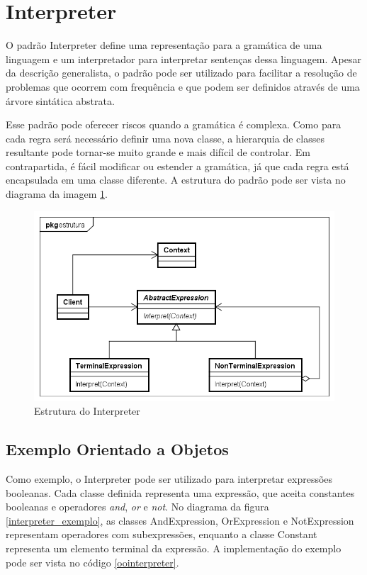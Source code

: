 \section{Interpreter}

O padrão Interpreter define uma representação para 
a gramática de uma linguagem e um interpretador para 
interpretar sentenças dessa linguagem. Apesar da 
descrição generalista, o padrão 
pode ser utilizado para facilitar a resolução de 
problemas que ocorrem com frequência e que podem 
ser definidos através de uma árvore sintática 
abstrata.\cite{gamma:1995}

Esse padrão pode oferecer riscos quando a gramática 
é complexa. Como para cada regra será necessário 
definir uma nova classe, a hierarquia de classes 
resultante pode tornar-se muito grande e mais 
difícil de controlar. Em contrapartida, é 
fácil modificar ou estender a gramática, já 
que cada regra está encapsulada em uma classe 
diferente. A estrutura do padrão pode ser vista 
no diagrama da imagem \ref{interpreter_struct}.

\begin{figure}[htb]
	\caption{\label{interpreter_struct}Estrutura do Interpreter}
	\begin{center}
	    \includegraphics[scale=0.5]{5_padroes-contexto-funcional/5.3_comportamentais/5.3.03_interpreter/Interpreter_struct.png}
	\end{center}
\end{figure}

\subsection*{Exemplo Orientado a Objetos}

Como exemplo, o Interpreter pode ser utilizado para 
interpretar expressões booleanas. Cada classe definida 
representa uma expressão, que aceita constantes  
booleanas e operadores \textit{and}, \textit{or} e 
\textit{not}. No diagrama da figura \ref{interpreter_exemplo}, 
as classes AndExpression, OrExpression e 
NotExpression representam operadores com subexpressões, 
enquanto a classe Constant representa um elemento 
terminal da expressão. A implementação do exemplo 
pode ser vista no código \ref{oointerpreter}.

